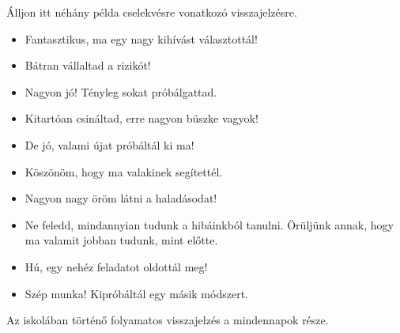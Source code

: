 Álljon itt néhány példa cselekvésre vonatkozó visszajelzésre.

\begin{itemize}
\tightlist
\item
  Fantasztikus, ma egy nagy kihívást választottál!
\item
  Bátran vállaltad a rizikót!
\item
  Nagyon jó! Tényleg sokat próbálgattad.
\item
  Kitartóan csináltad, erre nagyon büszke vagyok!
\item
  De jó, valami újat próbáltál ki ma!
\item
  Köszönöm, hogy ma valakinek segítettél.
\item
  Nagyon nagy öröm látni a haladásodat!
\item
  Ne feledd, mindannyian tudunk a hibáinkból tanulni. Örüljünk annak,
  hogy ma valamit jobban tudunk, mint előtte.
\item
  Hú, egy nehéz feladatot oldottál meg!
\item
  Szép munka! Kipróbáltál egy másik módszert.
\end{itemize}

Az iskolában történő folyamatos visszajelzés a mindennapok része.
